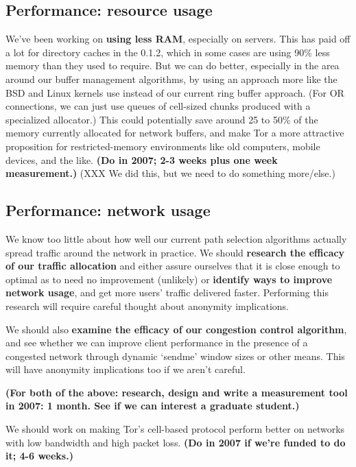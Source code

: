 \documentclass{article}
\newcommand{\plan}[1]{ {\bf (#1)}}
\begin{document}
\subsection{Performance: resource usage}
We've been working on {\bf using less RAM}, especially on servers.  This has
paid off a lot for directory caches in the 0.1.2, which in some cases are
using 90\% less memory than they used to require.  But we can do better,
especially in the area around our buffer management algorithms, by using an
approach more like the BSD and Linux kernels use instead of our current ring
buffer approach.  (For OR connections, we can just use queues of cell-sized
chunks produced with a specialized allocator.)  This could potentially save
around 25 to 50\% of the memory currently allocated for network buffers, and
make Tor a more attractive proposition for restricted-memory environments
like old computers, mobile devices, and the like.\plan{Do in 2007; 2-3 weeks
  plus one week measurement.} (XXX We did this, but we need to do something
more/else.)

\subsection{Performance: network usage}
We know too little about how well our current path
selection algorithms actually spread traffic around the network in practice.
We should {\bf research the efficacy of our traffic allocation} and either
assure ourselves that it is close enough to optimal as to need no improvement
(unlikely) or {\bf identify ways to improve network usage}, and get more
users' traffic delivered faster.  Performing this research will require
careful thought about anonymity implications.

We should also {\bf examine the efficacy of our congestion control
  algorithm}, and see whether we can improve client performance in the
presence of a congested network through dynamic `sendme' window sizes or
other means.  This will have anonymity implications too if we aren't careful.

\plan{For both of the above: research, design and write
  a measurement tool in 2007: 1 month.  See if we can interest a graduate
  student.}

We should work on making Tor's cell-based protocol  perform better on
networks with low bandwidth
and high packet loss.\plan{Do in 2007 if we're funded to do it; 4-6 weeks.}
\end{document}
